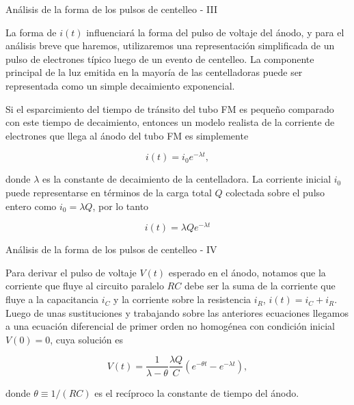 \documentclass[a4paper,10pt]{beamer}
\begin{document}
\begin{frame}{Análisis de la forma de los pulsos de centelleo - III}
 
 \begin{justify}
 La forma de $i(t)$ influenciará la forma del pulso de voltaje del ánodo, y para 
 el análisis breve que haremos, utilizaremos una representación simplificada 
 de un pulso de electrones típico luego de un evento de centelleo. La componente 
 principal de la luz emitida en la mayoría de las centelladoras puede ser 
 representada como un simple decaimiento exponencial.
 
 \vspace{.3cm}
 
 Si el esparcimiento del tiempo de tránsito del tubo FM es pequeño comparado con 
 este tiempo de decaimiento, entonces un modelo realista de la corriente de electrones 
 que llega al ánodo del tubo FM es simplemente
 
 \begin{equation}
  i(t) = i_0e^{-\lambda t},
 \end{equation}
 
 donde $\lambda$ es la constante de decaimiento de la centelladora. La corriente 
 inicial $i_0$puede representarse en términos de la carga total $Q$ colectada 
 sobre el pulso entero como $i_0 = \lambda Q$, por lo tanto
 
 \begin{equation}
  i(t) = \lambda Q e^{-\lambda t}
 \end{equation}
 \end{justify}
 
\end{frame}

\begin{frame}{Análisis de la forma de los pulsos de centelleo - IV}
 
 \begin{justify}
 Para derivar el pulso de voltaje $V(t)$ esperado en el ánodo, notamos que la 
 corriente que fluye al circuito paralelo $RC$ debe ser la suma de la corriente 
 que fluye a la capacitancia $i_C$ y la corriente sobre la resistencia $i_R$, 
 $i(t) = i_C + i_R$. Luego de unas sustituciones y trabajando sobre las anteriores 
 ecuaciones llegamos a una ecuación diferencial de primer orden no homogénea con 
 condición inicial $V(0) = 0$, cuya solución es 
 
 \begin{equation}
  V(t) = \frac{1}{\lambda - \theta}\frac{\lambda Q}{C}(e^{-\theta t} - e^{- \lambda t}),
 \end{equation}

 donde $\theta \equiv 1/(RC)$ es el recíproco la constante de tiempo del ánodo.
 
 \end{justify}
\end{frame}
\end{document}
